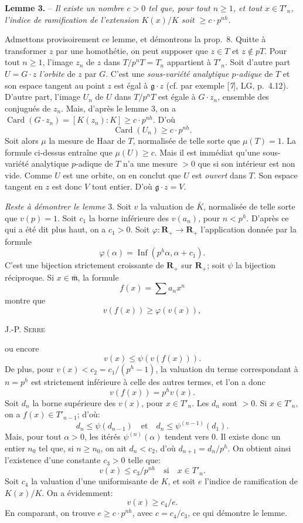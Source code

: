 \textbf{Lemme 3.} -- \textit{Il existe un nombre $c>0$ tel que, pour tout $n\geqslant 1$, et tout $x\in T'_n$, l’indice de ramification de l’extension $K(x)/K$ soit $\geqslant c\cdot p^{nh}$.}

Admettons provisoirement ce lemme, et démontrons la prop.~8. Quitte à transformer $z$ par une homothétie, on peut supposer que $z\in T$ et $z\notin pT$. Pour tout $n\geqslant 1$, l’image $z_n$ de $z$ dans $T/p^nT=T_n$ appartient à $T'_n$. Soit d’autre part $U=G\cdot z$ \textit{l’orbite} de $z$ par $G$. C’est une \textit{sous-variété analytique $p$-adique} de $T$ et son espace tangent au point $z$ est égal à $\mathfrak{g}\cdot z$ (cf. par exemple [\textit{7}], LG, p.~4.12). D’autre part, l’image $U_n$ de $U$ dans $T/p^nT$ est égale à $G\cdot z_n$, ensemble des conjugués de $z_n$. Mais, d’après le lemme 3, on a $\operatorname{Card}(G\cdot z_n)=[K(z_n):K]\geqslant c\cdot p^{nh}$. D’où
\[
\operatorname{Card}(U_n)\geqslant c\cdot p^{nh}.
\]
Soit alors $\mu$ la mesure de Haar de $T$, normalisée de telle sorte que $\mu(T)=1$. La formule ci-dessus entraîne que $\mu(U)\geqslant c$. Mais il est immédiat qu’une sous-variété analytique $p$-adique de $T$ n’a une mesure $>0$ que si son intérieur est non vide. Comme $U$ est une orbite, on en conclut que $U$ est \textit{ouvert} dans $T$. Son espace tangent en $z$ est donc $V$ tout entier. D’où $\mathfrak{g}\cdot z=V$.

\textit{Reste à démontrer le lemme} 3. Soit $v$ la valuation de $\bar K$, normalisée de telle sorte que $v(p)=1$. Soit $c_1$ la borne inférieure des $v(a_n)$, pour $n<p^h$. D’après ce qui a été dit plus haut, on a $c_1>0$. Soit $\varphi:\mathbf{R}_+\to\mathbf{R}_+$ l’application donnée par la formule
\[
\varphi(\alpha)=\operatorname{Inf}(p^h\alpha,\alpha+c_1).
\]
C’est une bijection strictement croissante de $\mathbf{R}_+$ sur $\mathbf{R}_+$; soit $\psi$ la bijection réciproque. Si $x\in\overline{\mathfrak{m}}$, la formule
\[
f(x)=\sum a_nx^n
\]
montre que
\[
v(f(x))\geqslant\varphi(v(x)),
\]
\begin{center}\small J.-P. \textsc{Serre}\end{center}
ou encore
\[
v(x)\leqslant\psi(v(f(x))).
\]
De plus, pour $v(x)<c_2=c_1/(p^h-1)$, la valuation du terme correspondant à $n=p^h$ est strictement inférieure à celle des autres termes, et l’on a donc
\[
v(f(x))=p^h v(x).
\]
Soit $d_n$ la borne supérieure des $v(x)$, pour $x\in T'_n$. Les $d_n$ sont $>0$. Si $x\in T'_n$, on a $f(x)\in T'_{n-1}$; d’où:
\[
d_n\leqslant\psi(d_{n-1})\quad\text{et}\quad d_n\leqslant\psi^{(n-1)}(d_1).
\]
Mais, pour tout $\alpha>0$, les itérés $\psi^{(n)}(\alpha)$ tendent vers $0$. Il existe donc un entier $n_0$ tel que, si $n\geqslant n_0$, on ait $d_n<c_2$, d’où $d_{n+1}=d_n/p^h$. On obtient ainsi l’existence d’une constante $c_3>0$ telle que:
\[
v(x)\leqslant c_3/p^{nh}\quad\text{si}\quad x\in T'_n.
\]
Soit $c_4$ la valuation d’une uniformisante de $K$, et soit $e$ l’indice de ramification de $K(x)/K$. On a évidemment:
\[
v(x)\geqslant c_4/e.
\]
En comparant, on trouve $e\geqslant c\cdot p^{nh}$, avec $c=c_4/c_3$, ce qui démontre le lemme.

